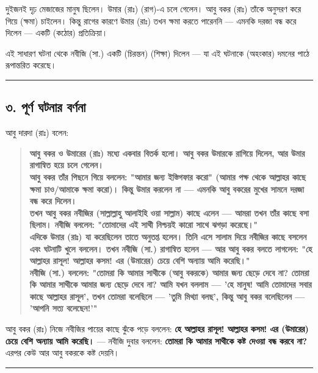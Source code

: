দুইজনই দৃঢ় মেজাজের মানুষ ছিলেন। উমার (রাঃ)  (রাগ)-এ চলে গেলেন। আবু বকর (রাঃ) তাঁকে অনুসরণ করে গিয়ে  (ক্ষমা) চাইলেন। কিন্তু রাগের কারণে উমার (রাঃ) তখন ক্ষমা করতে পারেননি — এমনকি দরজা বন্ধ করে দিলেন — একটি  (কঠোর) প্রতিক্রিয়া।

এই সাধারণ ঘটনা থেকে নবীজি (সা.) একটি  (চিরন্তন)  (শিক্ষা) দিলেন — যা এই ঘটনাকে  (অহংকার) দমনের পাঠে রূপান্তরিত করেছে।

\medskip\hrule\medskip

\subsection*{৩. পূর্ণ ঘটনার বর্ণনা}

আবু দারদা (রাঃ) বলেন:

\begin{quote}
\textbf{আবু বকর ও উমারের (রাঃ) মধ্যে একবার বিতর্ক হলো। আবু বকর উমারকে রাগিয়ে দিলেন, আর উমার রাগান্বিত হয়ে চলে গেলেন।} \\
\textbf{আবু বকর তাঁর পিছনে গিয়ে বললেন: "আমার জন্য ইস্তিগফার করো" (আমার পক্ষ থেকে আল্লাহর কাছে ক্ষমা চাও/আমাকে ক্ষমা করো)। কিন্তু উমার করলেন না — এমনকি আবু বকরের মুখের সামনে দরজা বন্ধ করে দিলেন।} \\
\textbf{তখন আবু বকর নবীজির (সাল্লাল্লাহু আলাইহি ওয়া সাল্লাম) কাছে এলেন — আমরা তখন তাঁর কাছে বসা ছিলাম। নবীজি বললেন: "তোমাদের এই সাথী নিশ্চয়ই কারো সাথে ঝগড়া করেছে।"} \\
\textbf{এদিকে উমার (রাঃ) যা করেছিলেন তাতে অনুতপ্ত হলেন। তিনি এসে সালাম দিয়ে নবীজির কাছে বসলেন এবং ঘটনাটি খুলে বললেন। তখন নবীজি (সা.) রাগান্বিত হলেন — আর আবু বকর বলতে লাগলেন: "হে আল্লাহর রাসূল! আল্লাহর কসম! এর (উমারের) চেয়ে বেশি অন্যায় আমি করেছি।"} \\
\textbf{নবীজি (সা.) বললেন: "তোমরা কি আমার সাথীকে (আবু বকরকে) আমার জন্য ছেড়ে দেবে না? তোমরা কি আমার সাথীকে আমার জন্য ছেড়ে দেবে না? আমি যখন বললাম — 'হে মানুষ! আমি তোমাদের সবার কাছে আল্লাহর রাসূল', তখন তোমরা বলেছিলে — 'তুমি মিথ্যা বলছ', কিন্তু আবু বকর বলেছিলেন — 'আপনি সত্য বলেছেন!'"}
\end{quote}

আবু বকর (রাঃ) নিজে নবীজির পায়ের কাছে ঝুঁকে পড়ে বললেন: \textbf{হে আল্লাহর রাসূল! আল্লাহর কসম! এর (উমারের) চেয়ে বেশি অন্যায় আমি করেছি।} — নবীজি দুবার বললেন: \textbf{তোমরা কি আমার সাথীকে কষ্ট দেওয়া বন্ধ করবে না?} এরপর কেউ আর আবু বকরকে কষ্ট দেয়নি।

\medskip\hrule\medskip

